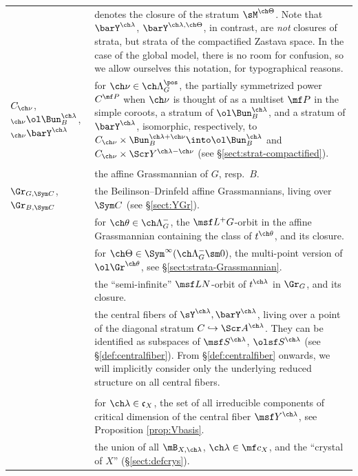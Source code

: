 \documentclass[final]{amsart}
\theoremstyle{remark}
\theoremstyle{definition}
\numberwithin{equation}{section}
\begin{document}
\begin{longtable}{>{\raggedleft}p{} p{} }
\\
{$\barM^{\ch\Theta}$} & {denotes the closure of the stratum $\sM^{\ch\Theta}$. Note that $\barY^{\ch\lambda}$, $\barY^{\ch\lambda,\ch\Theta}$, in contrast, are \emph{not} closures of strata, but strata of the compactified Zastava space. In the case of the global model, there is no room for confusion, so we allow ourselves this notation, for typographical reasons.}
\\
$C_{\ch\nu}$, ${_{\ch\nu}}\ol\Bun_B^{\ch\lambda}$, ${}_{\ch\nu} \barY^{\ch\lambda}$ & 
for $\ch\nu\in \ch\Lambda_G^{\pos}$, the partially symmetrized power $C^{\mf P}$ when $\ch\nu$ is thought of as a multiset $\mf P$ in the simple coroots, a stratum of $\ol\Bun_B^{\ch\lambda}$, and a stratum of $\barY^{\ch\lambda}$, isomorphic, respectively, to $C_{\ch\nu} \times \Bun^{\ch\lambda+\ch\nu}_B \into \ol\Bun^{\ch\lambda}_B$ and  $C_{\ch\nu} \times \Scr Y^{\ch\lambda-\ch\nu}$ (see \S \ref{sect:strat-compactified}).
\\
& \\
{$\Gr_G, \Gr_B$} & the affine Grassmannian of $G$, resp.\ $B$. 
\\
$\Gr_{G,\Sym C}$, $\Gr_{B,\Sym C}$ & {the Beilinson--Drinfeld affine Grassmannians, living over $\Sym C$ (see \S \ref{sect:YGr}).}
\\
{$\Gr_G^{\ch\theta}$, $\ol\Gr_G^{\ch\theta}$} & {for $\ch\theta\in \ch\Lambda_G^-$, the $\msf L^+G$-orbit in the affine Grassmannian containing the class of $t^{\ch\theta}$, and its closure.} \\
{$\ol\Gr^{\ch\Theta}_{G,C^{\ch\Theta}}$} & {for $\ch\Theta \in \Sym^\infty(\ch\Lambda_G^- \sm 0)$, the multi-point version of $\ol\Gr^{\ch\theta}$, see \S \ref{sect:strata-Grassmannian}.} \\
{$\msf S^{\ch\lambda}$, $\olsf S^{\ch\lambda}$} & {the ``semi-infinite'' $\msf LN$-orbit of $t^{\ch\lambda}$ in $\Gr_G$, and its closure.}
\\
{$\msf Y^{\ch\lambda},\, \olsf Y^{\ch\lambda}$} & {the central fibers of $\sY^{\ch\lambda}, \barY^{\ch\lambda}$, living over a point of the diagonal stratum $C\hookrightarrow \Scr A^{\ch\lambda}$. They can be identified as subspaces of $\msf S^{\ch\lambda}$, $\olsf S^{\ch\lambda}$ (see \S \ref{def:centralfiber}). From \S\ref{def:centralfiber} onwards, we will implicitly consider
only the underlying reduced structure on all central fibers.
}
\\
& \\
{$\mB_{X,\ch\lambda}$} & {for $\ch\lambda\in \mathfrak c_X$, the set of all irreducible components of critical dimension of the central fiber $\msf Y^{\ch\lambda}$, see Proposition \ref{prop:Vbasis}.} \\
{$\mB_X^+, \mB_X$} & {the union of all $\mB_{X,\ch\lambda}$, $\ch\lambda\in \mf c_X$, and the ``crystal of $X$'' (\S \ref{sect:defcrys}).}
\end{longtable}
\end{document}
